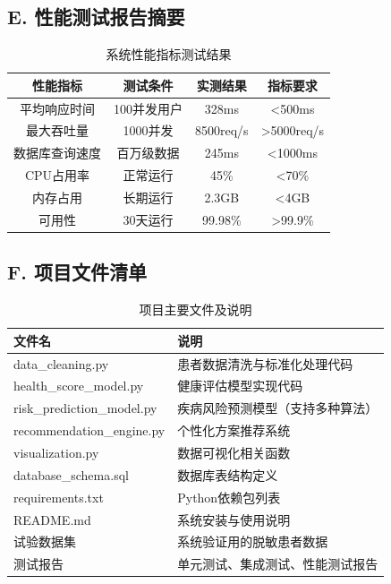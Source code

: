 \subsection*{E. 性能测试报告摘要}

\begin{table}[H]
  \centering
  \caption{系统性能指标测试结果}
  \label{tab:performance}
  \begin{tabularx}{\textwidth}{CCCC}
    \toprule
    性能指标 & 测试条件 & 实测结果 & 指标要求 \\
    \midrule
    平均响应时间 & 100并发用户 & 328ms & <500ms \\
    最大吞吐量 & 1000并发 & 8500req/s & >5000req/s \\
    数据库查询速度 & 百万级数据 & 245ms & <1000ms \\
    CPU占用率 & 正常运行 & 45\% & <70\% \\
    内存占用 & 长期运行 & 2.3GB & <4GB \\
    可用性 & 30天运行 & 99.98\% & >99.9\% \\
    \bottomrule
  \end{tabularx}
\end{table}

\subsection*{F. 项目文件清单}

\begin{table}[H]
  \centering
  \caption{项目主要文件及说明}
  \label{tab:appendix}
  \renewcommand{\arraystretch}{1.2}
  \begin{tabularx}{\textwidth}{LX}
    \toprule
    \textbf{文件名} & \textbf{说明} \\
    \midrule
    data\_cleaning.py & 患者数据清洗与标准化处理代码 \\
    health\_score\_model.py & 健康评估模型实现代码 \\
    risk\_prediction\_model.py & 疾病风险预测模型（支持多种算法） \\
    recommendation\_engine.py & 个性化方案推荐系统 \\
    visualization.py & 数据可视化相关函数 \\
    database\_schema.sql & 数据库表结构定义 \\
    requirements.txt & Python依赖包列表 \\
    README.md & 系统安装与使用说明 \\
    试验数据集 & 系统验证用的脱敏患者数据 \\
    测试报告 & 单元测试、集成测试、性能测试报告 \\
    \bottomrule
  \end{tabularx}
\end{table}
